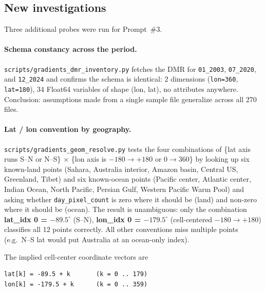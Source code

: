 \documentclass[11pt]{article}
\begin{document}
\subsection{New investigations}

Three additional probes were run for Prompt~\#3.

\paragraph{Schema constancy across the period.}
\texttt{scripts/gradients\_dmr\_inventory.py} fetches the DMR for
\texttt{01\_2003}, \texttt{07\_2020}, and \texttt{12\_2024} and
confirms the schema is identical: 2 dimensions
(\texttt{lon=360}, \texttt{lat=180}), 34 Float64 variables of
shape (lon, lat), no attributes anywhere. Conclusion: assumptions
made from a single sample file generalize across all 270 files.

\paragraph{Lat / lon convention by geography.}
\texttt{scripts/gradients\_geom\_resolve.py} tests the four
combinations of \{lat axis runs S--N or N--S\} $\times$
\{lon axis is $-180\to+180$ or $0\to360$\} by looking up six
known-land points (Sahara, Australia interior, Amazon basin,
Central US, Greenland, Tibet) and six known-ocean points (Pacific
center, Atlantic center, Indian Ocean, North Pacific, Persian Gulf,
Western Pacific Warm Pool) and asking whether \texttt{day\_pixel\_count}
is zero where it should be (land) and non-zero where it should be
(ocean). The result is unambiguous: only the combination
\textbf{lat\_idx 0 = $-89.5^\circ$} (S--N), \textbf{lon\_idx 0 =
$-179.5^\circ$} (cell-centered $-180\to+180$) classifies all 12
points correctly. All other conventions miss multiple points
(e.g.\ N--S lat would put Australia at an ocean-only index).

The implied cell-center coordinate vectors are
\begin{lstlisting}
lat[k] = -89.5 + k       (k = 0 .. 179)
lon[k] = -179.5 + k      (k = 0 .. 359)
\end{lstlisting}
\end{document}
